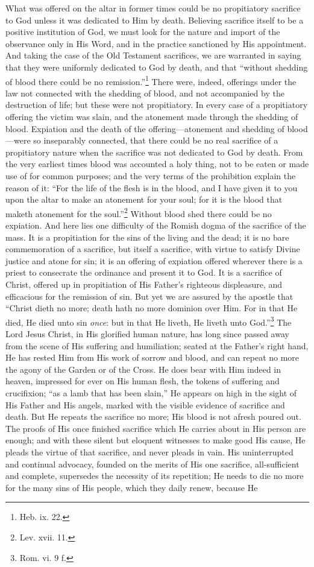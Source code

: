 \documentclass[english,]{book}
\begin{document}
What was offered on the altar in former times could be no propitiatory sacrifice to God unless it was dedicated to Him by death. Believing sacrifice itself to be a positive institution of God, we must look for the nature and import of the observance only in His Word, and in the practice sanctioned by His appointment. And taking the case of the Old Testament sacrifices, we are warranted in saying that they were uniformly dedicated to God by death, and that ``without shedding of blood there could be no remission.''\footnote{Heb. ix. 22.} There were, indeed, offerings under the law not connected with the shedding of blood, and not accompanied by the destruction of life; but these were not propitiatory. In every case of a propitiatory offering the victim was slain, and the atonement made through the shedding of blood. Expiation and the death of the offering---atonement and shedding of blood---were so inseparably connected, that there could be no real sacrifice of a propitiatory nature when the sacrifice was not dedicated to God by death. From the very earliest times blood was accounted a holy thing, not to be eaten or made use of for common purposes; and the very terms of the prohibition explain the reason of it: ``For the life of the flesh is in the blood, and I have given it to you upon the altar to make an atonement for your soul; for it is the blood that maketh atonement for the soul.''\footnote{Lev. xvii. 11.} Without blood shed there could be no expiation. And here lies one difficulty of the Romish dogma of the sacrifice of the mass. It is a propitiation for the sins of the living and the dead; it is no bare commemoration of a sacrifice, but itself a sacrifice, with virtue to satisfy Divine justice and atone for sin; it is an offering of expiation offered wherever there is a priest to consecrate the ordinance and present it to God. It is a sacrifice of Christ, offered up in propitiation of His Father's righteous displeasure, and efficacious for the remission of sin. But yet we are assured by the apostle that ``Christ dieth no more; death hath no more dominion over Him. For in that He died, He died unto sin \emph{once}: but in that He liveth, He liveth unto God.''\footnote{Rom. vi. 9 f.} The Lord Jesus Christ, in His glorified human nature, has long since passed away from the scene of His suffering and humiliation; seated at the Father's right hand, He has rested Him from His work of sorrow and blood, and can repeat no more the agony of the Garden or of the Cross. He does bear with Him indeed in heaven, impressed for ever on His human flesh, the tokens of suffering and crucifixion; ``as a lamb that has been slain,'' He appears on high in the sight of His Father and His angels, marked with the visible evidence of sacrifice and death. But He repeats the sacrifice no more; His blood is not afresh poured out. The proofs of His once finished sacrifice which He carries about in His person are enough; and with these silent but eloquent witnesses to make good His cause, He pleads the virtue of that sacrifice, and never pleads in vain. His uninterrupted and continual advocacy, founded on the merits of His one sacrifice, all-sufficient and complete, supersedes the necessity of its repetition; He needs to die no more for the many sins of His people, which they daily renew, because He 
\end{document}
